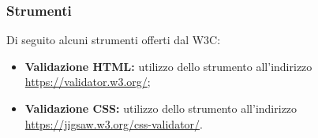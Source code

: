 \subsubsection{Strumenti}

Di seguito alcuni strumenti offerti dal W3C:
\begin{itemize}
	\item \textbf{Validazione HTML:} utilizzo dello strumento all'indirizzo \url{https://validator.w3.org/};
	\item \textbf{Validazione CSS: } utilizzo dello strumento all'indirizzo \url{https://jigsaw.w3.org/css-validator/}.
\end{itemize}